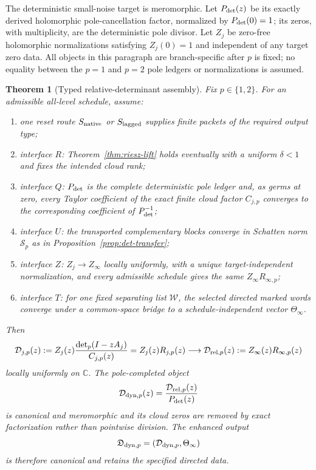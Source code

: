 \documentclass[11pt]{article}
\newtheorem{theorem}{Theorem}[section]
\theoremstyle{definition}
\theoremstyle{remark}
\newcommand{\cD}{\mathcal D}
\begin{document}
The deterministic small-noise target is meromorphic.  Let $P_{\rm det}(z)$
be its exactly derived holomorphic pole-cancellation factor, normalized by
$P_{\rm det}(0)=1$; its zeros, with multiplicity, are the deterministic pole
divisor.  Let $Z_j$ be zero-free holomorphic normalizations satisfying
$Z_j(0)=1$ and independent of any target zero data.
All objects in this paragraph are branch-specific after $p$ is fixed; no
equality between the $p=1$ and $p=2$ pole ledgers or normalizations is
assumed.

\begin{theorem}[Typed relative-determinant assembly]\label{thm:assembly}
Fix $p\in\{1,2\}$.  For an admissible all-level schedule, assume:
\begin{enumerate}[label=\textnormal{(\Alph*)},leftmargin=3em]
\item one reset route $S_{\rm native}$ or $S_{\rm lagged}$ supplies finite
packets of the required output type;
\item interface $R$: Theorem~\ref{thm:riesz-lift} holds eventually with a
uniform $\delta<1$ and fixes the intended cloud rank;
\item interface $Q$: $P_{\rm det}$ is the complete deterministic pole ledger
and, as germs at zero, every Taylor coefficient of the exact finite cloud
factor $C_{j,p}$ converges to the corresponding coefficient of
$P_{\rm det}^{-1}$;
\item interface $U$: the transported complementary blocks converge in
Schatten norm $\mathcal S_p$ as in Proposition~\ref{prop:det-transfer};
\item interface $Z$: $Z_j\to Z_\infty$ locally uniformly, with a unique
target-independent normalization, and every admissible schedule gives the
same $Z_\infty R_{\infty,p}$;
\item interface $T$: for one fixed separating list $\mathcal W$, the selected
directed marked words converge under a common-space bridge to a
schedule-independent vector $\Theta_\infty$.
\end{enumerate}
Then
\begin{equation}\label{eq:assembled-object}
 \cD_{j,p}(z):=Z_j(z)\frac{\det_p(I-zA_j)}{C_{j,p}(z)}
 =Z_j(z)R_{j,p}(z)
 \longrightarrow \cD_{{\rm rel},p}(z):=Z_\infty(z)R_{\infty,p}(z)
\end{equation}
locally uniformly on $\mathbb C$.  The pole-completed object
\begin{equation}\label{eq:meromorphic-object}
 \cD_{{\rm dyn},p}(z)=\frac{\cD_{{\rm rel},p}(z)}{P_{\rm det}(z)}
\end{equation}
is canonical and meromorphic and its cloud zeros are removed by exact
factorization rather than pointwise division.  The enhanced output
\[
 \mathfrak D_{{\rm dyn},p}=(\cD_{{\rm dyn},p},\Theta_\infty)
\]
is therefore canonical and retains the specified directed data.
\end{theorem}
\end{document}
